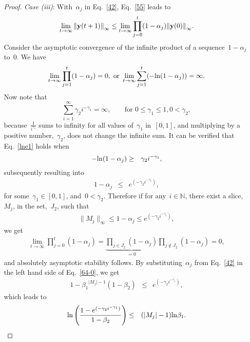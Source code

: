 \documentclass[draftclsnofoot, onecolumn, 12pt]{IEEEtran}
\def\ln{{\rm ln}}
\begin{document}
\begin{proof}
\textit{Case (iii)}: With~$\alpha_j$ in Eq.~\eqref{42}, Eq.~\eqref{55} leads to
\begin{eqnarray}\label{62}
\lim_{t \rightarrow \infty}{\Vert {\bf{y}}(t+1) \Vert}_{\infty} \leq \lim_{t \rightarrow \infty} \prod_{j=0}^t(1-\alpha_j) {\Vert {\bf{y}}(0) \Vert}_{\infty}.
\end{eqnarray}
Consider the asymptotic convergence of the infinite product of a sequence~$1-\alpha_j$ to~$0$. We have
\begin{eqnarray}\label{lne1}
\lim_{t \rightarrow \infty}\prod_{j=1}^t(1-\alpha_j)=0,\mbox{ or } \lim_{t \rightarrow \infty}\sum_{j=1}^t(-\ln(1-\alpha_j))=\infty.
\end{eqnarray}
Now note that
\[
\sum_{i=1}^{\infty}\gamma_2i^{-\gamma_1} = \infty, \qquad \mbox{for }0\leq\gamma_1\leq 1,0<\gamma_2,
\]
because~$\frac{1}{i^{\gamma_1}}$ sums to infinity for all values of~$\gamma_1$ in~$[0,1]$, and multiplying by a positive number,~$\gamma_2$, does not change the infinite sum. It can be verified that Eq.~\eqref{lne1} holds when 
\begin{eqnarray*}
-\ln(1-\alpha_j) &\geq& \gamma_2i^{-\gamma_1},
\end{eqnarray*}
subsequently resulting into 
\begin{eqnarray*}
1-\alpha_j &\leq& e^{(-\gamma_2i^{-\gamma_1})},
\end{eqnarray*}
for some~$\gamma_1\in[0,1]$, and~$0<\gamma_2$.
Therefore if for any~$i \in \mathbb{N}$, there exist a slice,~$M_j$, in the set,~$J_2$, such that
\begin{eqnarray}\label{64-0}
\|M_j\|_\infty\leq 1-\alpha_j \leq e^{(-\gamma_2i^{-\gamma_1})},
\end{eqnarray}
we get
\begin{eqnarray}\label{57}
\lim_{t \rightarrow \infty}\prod_{j=0}^t(1-\alpha_j) = \underbrace{\prod_{j\in J_2}(1-\alpha_j)}_{=0} \prod_{j\notin J_2}(1-\alpha_j)=0,
\end{eqnarray}
and absolutely asymptotic stability follows. By substituting~$\alpha_j$ from Eq.~\eqref{42} in the left hand side of Eq.~\eqref{64-0}, we get
\begin{eqnarray}\nonumber
1 - {\beta_1}^{{{\vert M_j \vert}} - 1}({1-\beta}_2) &\leq&  e^{(-\gamma_2i^{-\gamma_1})},
\end{eqnarray}
which leads to 
\begin{eqnarray}\label{65}
\ln\left(\frac{1 - e^{(-\gamma_2i^{-\gamma_1})}}{1-\beta_2}\right) &\leq&  (\vert M_j \vert - 1)\ln\beta_1.\label{58}
\end{eqnarray}

\end{proof}
\end{document}
